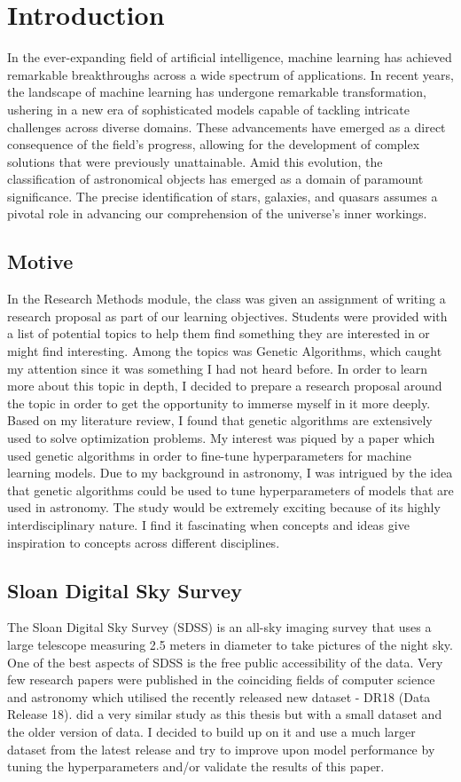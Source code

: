 \chapter{Introduction}


In the ever-expanding field of artificial intelligence, machine learning has achieved remarkable breakthroughs across a wide spectrum of applications. In recent years, the landscape of machine learning has undergone remarkable transformation, ushering in a new era of sophisticated models capable of tackling intricate challenges across diverse domains. These advancements have emerged as a direct consequence of the field's progress, allowing for the development of complex solutions that were previously unattainable. Amid this evolution, the classification of astronomical objects has emerged as a domain of paramount significance. The precise identification of stars, galaxies, and quasars assumes a pivotal role in advancing our comprehension of the universe's inner workings.

\section{Motive}
In the Research Methods module, the class was given an assignment of writing a research proposal as part of our learning objectives. Students were provided with a list of potential topics to help them find something they are interested in or might find interesting. Among the topics was Genetic Algorithms, which caught my attention since it was something I had not heard before. In order to learn more about this topic in depth, I decided to prepare a research proposal around the topic in order to get the opportunity to immerse myself in it more deeply. Based on my literature review, I found that genetic algorithms are extensively used to solve optimization problems. My interest was piqued by a paper which used genetic algorithms in order to fine-tune hyperparameters for machine learning models. Due to my background in astronomy, I was intrigued by the idea that genetic algorithms could be used to tune hyperparameters of models that are used in astronomy. The study would be extremely exciting because of its highly interdisciplinary nature. I find it fascinating when concepts and ideas give inspiration to concepts across different disciplines.

\section{Sloan Digital Sky Survey}
The Sloan Digital Sky Survey (SDSS) is an all-sky imaging survey that uses a large telescope measuring 2.5 meters in diameter to take pictures of the night sky. One of the best aspects of SDSS is the free public accessibility of the data. Very few research papers were published in the coinciding fields of computer science and astronomy which utilised the recently released new dataset - DR18 (Data Release 18). \cite{Wierzbiński} did a very similar study as this thesis but with a small dataset and the older version of data. I decided to build up on it and use a much larger dataset from the latest release and try to improve upon model performance by tuning the hyperparameters and/or validate the results of this paper.

